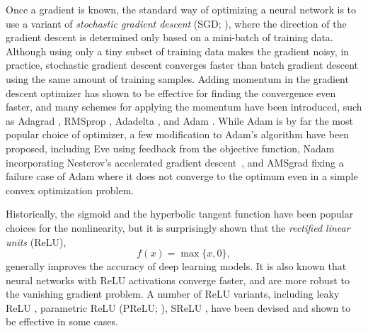 Once a gradient is known, the standard way of optimizing a neural network is to use a variant of \emph{stochastic gradient descent} (SGD; ), where the direction of the gradient descent is determined only based on a mini-batch of training data.
Although using only a tiny subset of training data makes the gradient noisy, in practice, stochastic gradient descent converges faster than batch gradient descent using the same amount of training samples.
Adding momentum \cite{polyak1964momentum,sutskever2013momentum} in the gradient descent optimizer has shown to be effective for finding the convergence even faster, and many schemes for applying the momentum have been introduced, such as Adagrad \cite{duchi2011adagrad}, RMSprop \cite{hinton2012rmsprop}, Adadelta \cite{zeiler2012adadelta}, and Adam \cite{kingma2015adam}.
While Adam is by far the most popular choice of optimizer, a few modification to Adam's algorithm have been proposed, including Eve \cite{koushik2016eve} using feedback from the objective function, Nadam \cite{dozat2016nadam} incorporating Nesterov's accelerated gradient descent~\cite{nesterov1983accelerated}, and AMSgrad \cite{reddi2018amsgrad} fixing a failure case of Adam where it does not converge to the optimum even in a simple convex optimization problem.

Historically, the sigmoid and the hyperbolic tangent function have been popular choices for the nonlinearity, but it is surprisingly shown \cite{nair2010relu} that the \emph{rectified linear units} (ReLU),
\begin{equation}
	f(x) = \max \{ x, 0 \},
\end{equation}
generally improves the accuracy of deep learning models.
It is also known that neural networks with ReLU activations converge faster, and are more robust to the vanishing gradient problem.
A number of ReLU variants, including leaky ReLU \cite{xu2015leakyrelu}, parametric ReLU (PReLU; ), SReLU \cite{jin2015srelu}, have been devised and shown to be effective in some cases.



